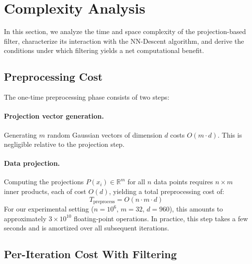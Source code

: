 





\section{Complexity Analysis}
\label{sec:analysis}

In this section, we analyze the time and space complexity of the projection-based filter, characterize its interaction with the NN-Descent algorithm, and derive the conditions under which filtering yields a net computational benefit.

\subsection{Preprocessing Cost}
\label{sec:preprocessing}

The one-time preprocessing phase consists of two steps:

\paragraph{Projection vector generation.}
Generating $m$ random Gaussian vectors of dimension $d$ costs $O(m \cdot d)$.
This is negligible relative to the projection step.

\paragraph{Data projection.}
Computing the projections $P(x_i) \in \mathbb{R}^m$ for all $n$ data points requires $n \times m$ inner products, each of cost $O(d)$, yielding a total preprocessing cost of:
\begin{equation}
    T_{\text{preprocess}} = O(n \cdot m \cdot d)
    \label{eq:preprocess}
\end{equation}
For our experimental setting ($n = 10^6$, $m = 32$, $d = 960$), this amounts to approximately $3 \times 10^{10}$ floating-point operations.
In practice, this step takes a few seconds and is amortized over all subsequent iterations.

\subsection{Per-Iteration Cost With Filtering}
\label{sec:per_iteration}

